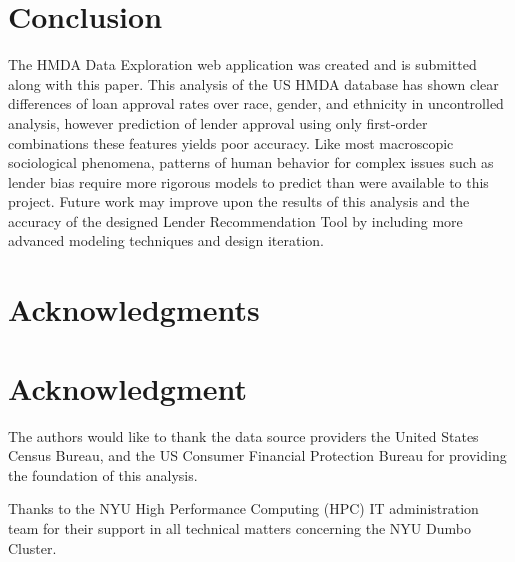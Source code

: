 \documentclass[conference,compsoc]{IEEEtran}
\begin{document}




\section{Conclusion}
The HMDA Data Exploration web application was created and is submitted along with this paper. This analysis of the US HMDA database has shown clear differences of loan approval rates over race, gender, and ethnicity in uncontrolled analysis, however prediction of lender approval using only first-order combinations these features yields poor accuracy. Like most macroscopic sociological phenomena, patterns of human behavior for complex issues such as lender bias require more rigorous models to predict than were available to this project. Future work may improve upon the results of this analysis and the accuracy of the designed Lender Recommendation Tool by including more advanced modeling techniques and design iteration.







\ifCLASSOPTIONcompsoc
  \section*{Acknowledgments}
\else
  \section*{Acknowledgment}
\fi


The authors would like to thank the data source providers the United States Census Bureau, and the US Consumer Financial Protection Bureau for providing the foundation of this analysis. 

Thanks to the NYU High Performance Computing (HPC) IT administration team for their support in all technical matters concerning the NYU Dumbo Cluster.
\end{document}
